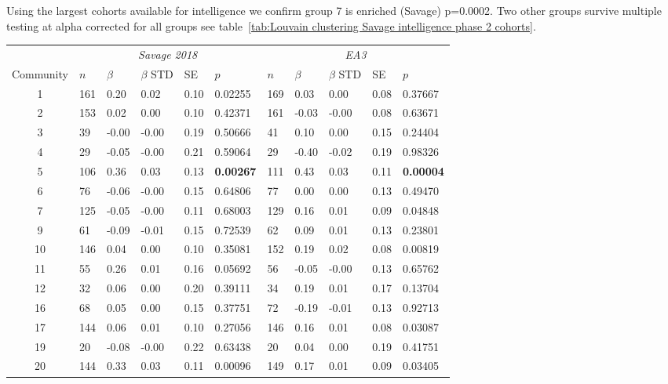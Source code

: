 Using the largest cohorts available for intelligence we confirm group 7 is enriched (Savage) p=0.0002. Two other groups survive multiple testing at alpha corrected for all groups see table~\ref{tab:Louvain clustering Savage intelligence phase 2 cohorts}. 


\begin{table}[ht]
\centering
\setlength{\extrarowheight}{2pt}
\begin{tabular}{cllllllllll}
  \toprule
   &  \multicolumn{5}{c}{\textit{Savage 2018}} & \multicolumn{5}{c}{\textit{EA3}} \\
    \cmidrule{2-11}
Community & $n$ & $\beta$ & $\beta$ STD & SE & $p$ & $n$ & $\beta$ & $\beta$ STD & SE & $p$\\ 
  \midrule
1 & 161 & 0.20 & 0.02 & 0.10 & 0.02255 & 169 & 0.03 & 0.00 & 0.08 & 0.37667 \\ 
  2 & 153 & 0.02 & 0.00 & 0.10 & 0.42371 & 161 & -0.03 & -0.00 & 0.08 & 0.63671 \\ 
  3 & 39 & -0.00 & -0.00 & 0.19 & 0.50666 & 41 & 0.10 & 0.00 & 0.15 & 0.24404 \\ 
  4 & 29 & -0.05 & -0.00 & 0.21 & 0.59064 & 29 & -0.40 & -0.02 & 0.19 & 0.98326 \\ 
  5 & 106 & 0.36 & 0.03 & 0.13 & \textbf{0.00267} & 111 & 0.43 & 0.03 & 0.11 & \textbf{0.00004} \\ 
  6 & 76 & -0.06 & -0.00 & 0.15 & 0.64806 & 77 & 0.00 & 0.00 & 0.13 & 0.49470 \\ 
  7 & 125 & -0.05 & -0.00 & 0.11 & 0.68003 & 129 & 0.16 & 0.01 & 0.09 & 0.04848 \\ 
  9 & 61 & -0.09 & -0.01 & 0.15 & 0.72539 & 62 & 0.09 & 0.01 & 0.13 & 0.23801 \\ 
  10 & 146 & 0.04 & 0.00 & 0.10 & 0.35081 & 152 & 0.19 & 0.02 & 0.08 & 0.00819 \\ 
  11 & 55 & 0.26 & 0.01 & 0.16 & 0.05692 & 56 & -0.05 & -0.00 & 0.13 & 0.65762 \\ 
  12 & 32 & 0.06 & 0.00 & 0.20 & 0.39111 & 34 & 0.19 & 0.01 & 0.17 & 0.13704 \\ 
  16 & 68 & 0.05 & 0.00 & 0.15 & 0.37751 & 72 & -0.19 & -0.01 & 0.13 & 0.92713 \\ 
  17 & 144 & 0.06 & 0.01 & 0.10 & 0.27056 & 146 & 0.16 & 0.01 & 0.08 & 0.03087 \\ 
  19 & 20 & -0.08 & -0.00 & 0.22 & 0.63438 & 20 & 0.04 & 0.00 & 0.19 & 0.41751 \\ 
  20 & 144 & 0.33 & 0.03 & 0.11 & 0.00096 & 149 & 0.17 & 0.01 & 0.09 & 0.03405 \\ 

\end{tabular}
\end{table}
